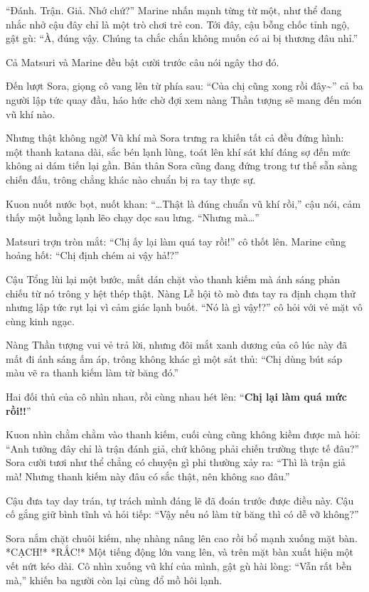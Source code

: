 \documentclass[../main.tex]{subfiles}
\begin{document}
``Đánh. Trận. Giả. Nhớ chứ?'' Marine nhấn mạnh từng từ một, như thể đang nhắc nhở cậu đây chỉ là một trò chơi trẻ con. Tới đây, cậu bỗng chốc tỉnh ngộ, gật gù: ``À, đúng vậy. Chúng ta chắc chắn không muốn có ai bị thương đâu nhỉ.''

Cả Matsuri và Marine đều bật cười trước câu nói ngây thơ đó.

Đến lượt Sora, giọng cô vang lên từ phía sau: ``Của chị cũng xong rồi đây\~{}'' cả ba người lập tức quay đầu, háo hức chờ đợi xem nàng Thần tượng sẽ mang đến món vũ khí nào.

Nhưng thật không ngờ! Vũ khí mà Sora trưng ra khiến tất cả đều đứng hình: một thanh katana dài, sắc bén lạnh lùng, toát lên khí sát khí đáng sợ đến mức không ai dám tiến lại gần. Bản thân Sora cũng đang đứng trong tư thế sẵn sàng chiến đấu, trông chẳng khác nào chuẩn bị ra tay thực sự.

Kuon nuốt nước bọt, nuốt khan: ``\dots Thật là đúng chuẩn vũ khí rồi,'' cậu nói, cảm thấy một luồng lạnh lẽo chạy dọc sau lưng. ``Nhưng mà\dots''

Matsuri trợn tròn mắt: ``Chị ấy lại làm quá tay rồi!'' cô thốt lên. Marine cũng hoảng hốt: ``Chị định chém ai vậy hả!?''

Cậu Tổng lùi lại một bước, mắt dán chặt vào thanh kiếm mà ánh sáng phản chiếu từ nó trông y hệt thép thật. Nàng Lễ hội tò mò đưa tay ra định chạm thử nhưng lập tức rụt lại vì cảm giác lạnh buốt. ``Nó là gì vậy!?'' cô hỏi với vẻ mặt vô cùng kinh ngạc.

Nàng Thần tượng vui vẻ trả lời, nhưng đôi mắt xanh dương của cô lúc này đã mất đi ánh sáng ấm áp, trông không khác gì một sát thủ: ``Chị dùng bút sáp màu vẽ ra thanh kiếm làm từ băng đó.''

Hai đối thủ của cô nhìn nhau, rồi cùng nhau hét lên: ``\textbf{Chị lại làm quá mức rồi!!}''

Kuon nhìn chằm chằm vào thanh kiếm, cuối cùng cũng không kiềm được mà hỏi: ``Anh tưởng đây chỉ là trận đánh giả, chứ không phải chiến trường thực tế đâu?'' Sora cười tươi như thể chẳng có chuyện gì phi thường xảy ra: ``Thì là trận giả mà! Nhưng thanh kiếm này đâu có sắc thật, nên không sao đâu.''

Cậu đưa tay day trán, tự trách mình đáng lẽ đã đoán trước được điều này. Cậu cố gắng giữ bình tĩnh và hỏi tiếp: ``Vậy nếu nó làm từ băng thì có dễ vỡ không?''

Sora nắm chặt chuôi kiếm, nhẹ nhàng nâng lên cao rồi bổ mạnh xuống mặt bàn. *CẠCH!* *RẮC!* Một tiếng động lớn vang lên, và trên mặt bàn xuất hiện một vết nứt kéo dài. Cô nhìn xuống vũ khí của mình, gật gù hài lòng: ``Vẫn rất bền mà,'' khiến ba người còn lại cùng đổ mồ hôi lạnh.
\end{document}
